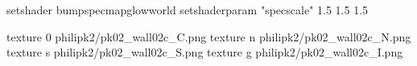 setshader bumpspecmapglowworld
setshaderparam "specscale" 1.5 1.5 1.5


texture 0 philipk2/pk02_wall02c_C.png
texture n philipk2/pk02_wall02c_N.png
texture s philipk2/pk02_wall02c_S.png
texture g philipk2/pk02_wall02c_I.png

